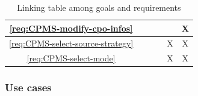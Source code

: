 \begin{table}[h]
\begin{center}
\begin{tabular}{|c||c|c|c|c|c|}
            \ref{req:CPMS-modify-cpo-infos}       &                                 &                                &                              &                                & X                              \\\hline
            \ref{req:CPMS-select-source-strategy} &                                 &                                &                              & X                              & X                              \\\hline
            \ref{req:CPMS-select-mode}            &                                 &                                &                              & X                              & X                              \\\hline
        \end{tabular}
    \end{center}
    \caption{Linking table among goals and requirements}
\end{table}

\clearpage
\subsubsection{Use cases}


